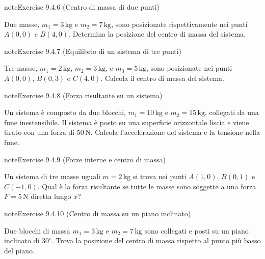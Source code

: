 \documentclass[letterpaper,10pt,italian]{jupyterBook}
\begin{document}
\begin{sphinxadmonition}{note}{Exercise 9.4.6 (Centro di massa di due punti)}



\sphinxAtStartPar
Due masse, \(m_1 = 3 \, \text{kg}\) e \(m_2 = 7 \, \text{kg}\), sono posizionate rispettivamente nei punti \(A(0, 0)\) e \(B(4, 0)\). Determina la posizione del centro di massa del sistema.
\end{sphinxadmonition}
 \label{exercise:ch/mechanics/statics-problems-exercise-6}

\begin{sphinxadmonition}{note}{Exercise 9.4.7 (Equilibrio di un sistema di tre punti)}



\sphinxAtStartPar
Tre masse, \(m_1 = 2 \, \text{kg}\), \(m_2 = 3 \, \text{kg}\), e \(m_3 = 5 \, \text{kg}\), sono posizionate nei punti \(A(0, 0)\), \(B(0, 3)\) e \(C(4, 0)\). Calcola il centro di massa del sistema.
\end{sphinxadmonition}
 \label{exercise:ch/mechanics/statics-problems-exercise-7}

\begin{sphinxadmonition}{note}{Exercise 9.4.8 (Forza risultante su un sistema)}



\sphinxAtStartPar
Un sistema è composto da due blocchi, \(m_1 = 10 \, \text{kg}\) e \(m_2 = 15 \, \text{kg}\), collegati da una fune inestensibile. Il sistema è posto su una superficie orizzontale liscia e viene tirato con una forza di \(50 \, \text{N}\). Calcola l’accelerazione del sistema e la tensione nella fune.
\end{sphinxadmonition}
 \label{exercise:ch/mechanics/statics-problems-exercise-8}

\begin{sphinxadmonition}{note}{Exercise 9.4.9 (Forze interne e centro di massa)}



\sphinxAtStartPar
Un sistema di tre masse uguali \(m = 2 \, \text{kg}\) si trova nei punti \(A(1, 0)\), \(B(0, 1)\) e \(C(-1, 0)\). Qual è la forza risultante se tutte le masse sono soggette a una forza \(F = 5 \, \text{N}\) diretta lungo \(x\)?
\end{sphinxadmonition}
 \label{exercise:ch/mechanics/statics-problems-exercise-9}

\begin{sphinxadmonition}{note}{Exercise 9.4.10 (Centro di massa su un piano inclinato)}



\sphinxAtStartPar
Due blocchi di massa \(m_1 = 3 \, \text{kg}\) e \(m_2 = 7 \, \text{kg}\) sono collegati e posti su un piano inclinato di \(30^\circ\). Trova la posizione del centro di massa rispetto al punto più basso del piano.
\end{sphinxadmonition}
\end{document}

